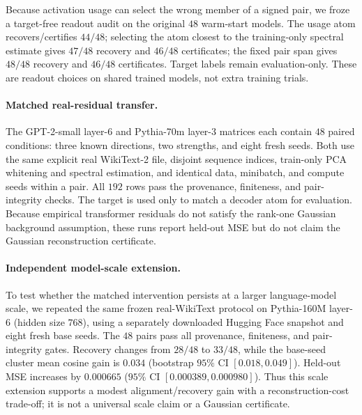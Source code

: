 \documentclass{article}
\theoremstyle{plain}
\begin{document}
{Because activation usage can select the wrong member of a signed pair, we froze a target-free readout audit on the original $48$ warm-start models. The usage atom recovers/certifies $44/48$; selecting the atom closest to the training-only spectral estimate gives $47/48$ recovery and $46/48$ certificates; the fixed pair span gives $48/48$ recovery and $46/48$ certificates. Target labels remain evaluation-only. These are readout choices on shared trained models, not extra training trials.

\paragraph{Matched real-residual transfer.}
The GPT-2-small layer-$6$ and Pythia-70m layer-$3$ matrices each contain $48$ paired conditions: three known directions, two strengths, and eight fresh seeds. Both use the same explicit real WikiText-2 file, disjoint sequence indices, train-only PCA whitening and spectral estimation, and identical data, minibatch, and compute seeds within a pair. All $192$ rows pass the provenance, finiteness, and pair-integrity checks. The target is used only to match a decoder atom for evaluation. Because empirical transformer residuals do not satisfy the rank-one Gaussian background assumption, these runs report held-out MSE but do not claim the Gaussian reconstruction certificate.

\paragraph{Independent model-scale extension.}
To test whether the matched intervention persists at a larger language-model scale, we repeated the same frozen real-WikiText protocol on Pythia-160M layer-$6$ (hidden size $768$), using a separately downloaded Hugging Face snapshot and eight fresh base seeds. The $48$ pairs pass all provenance, finiteness, and pair-integrity gates. Recovery changes from $28/48$ to $33/48$, while the base-seed cluster mean cosine gain is $0.034$ (bootstrap $95\%$ CI $[0.018,0.049]$). Held-out MSE increases by $0.000665$ ($95\%$ CI $[0.000389,0.000980]$). Thus this scale extension supports a modest alignment/recovery gain with a reconstruction-cost trade-off; it is not a universal scale claim or a Gaussian certificate.

}
\end{document}
